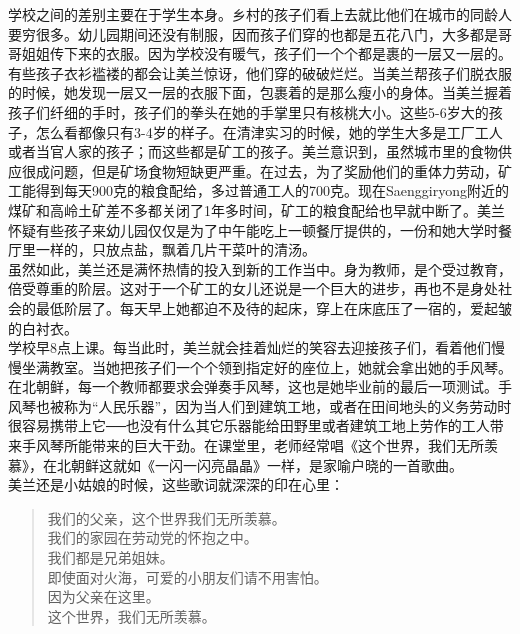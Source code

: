 学校之间的差别主要在于学生本身。乡村的孩子们看上去就比他们在城市的同龄人要穷很多。幼儿园期间还没有制服，因而孩子们穿的也都是五花八门，大多都是哥哥姐姐传下来的衣服。因为学校没有暖气，孩子们一个个都是裹的一层又一层的。有些孩子衣衫褴褛的都会让美兰惊讶，他们穿的破破烂烂。当美兰帮孩子们脱衣服的时候，她发现一层又一层的衣服下面，包裹着的是那么瘦小的身体。当美兰握着孩子们纤细的手时，孩子们的拳头在她的手掌里只有核桃大小。这些5-6岁大的孩子，怎么看都像只有3-4岁的样子。在清津实习的时候，她的学生大多是工厂工人或者当官人家的孩子；而这些都是矿工的孩子。美兰意识到，虽然城市里的食物供应很成问题，但是矿场食物短缺更严重。在过去，为了奖励他们的重体力劳动，矿工能得到每天900克的粮食配给，多过普通工人的700克。现在Saenggiryong附近的煤矿和高岭土矿差不多都关闭了1年多时间，矿工的粮食配给也早就中断了。美兰怀疑有些孩子来幼儿园仅仅是为了中午能吃上一顿餐厅提供的，一份和她大学时餐厅里一样的，只放点盐，飘着几片干菜叶的清汤。\\

虽然如此，美兰还是满怀热情的投入到新的工作当中。身为教师，是个受过教育，倍受尊重的阶层。这对于一个矿工的女儿还说是一个巨大的进步，再也不是身处社会的最低阶层了。每天早上她都迫不及待的起床，穿上在床底压了一宿的，爱起皱的白衬衣。\\

学校早8点上课。每当此时，美兰就会挂着灿烂的笑容去迎接孩子们，看着他们慢慢坐满教室。当她把孩子们一个个领到指定好的座位上，她就会拿出她的手风琴。在北朝鲜，每一个教师都要求会弹奏手风琴，这也是她毕业前的最后一项测试。手风琴也被称为“人民乐器”，因为当人们到建筑工地，或者在田间地头的义务劳动时很容易携带上它──也没有什么其它乐器能给田野里或者建筑工地上劳作的工人带来手风琴所能带来的巨大干劲。在课堂里，老师经常唱《这个世界，我们无所羡慕》，在北朝鲜这就如《一闪一闪亮晶晶》一样，是家喻户晓的一首歌曲。\\

美兰还是小姑娘的时候，这些歌词就深深的印在心里：\\

\begin{quote}
	我们的父亲，这个世界我们无所羡慕。\\

	我们的家园在劳动党的怀抱之中。\\

	我们都是兄弟姐妹。\\

	即使面对火海，可爱的小朋友们请不用害怕。\\

	因为父亲在这里。\\

	这个世界，我们无所羡慕。\\
\end{quote}

